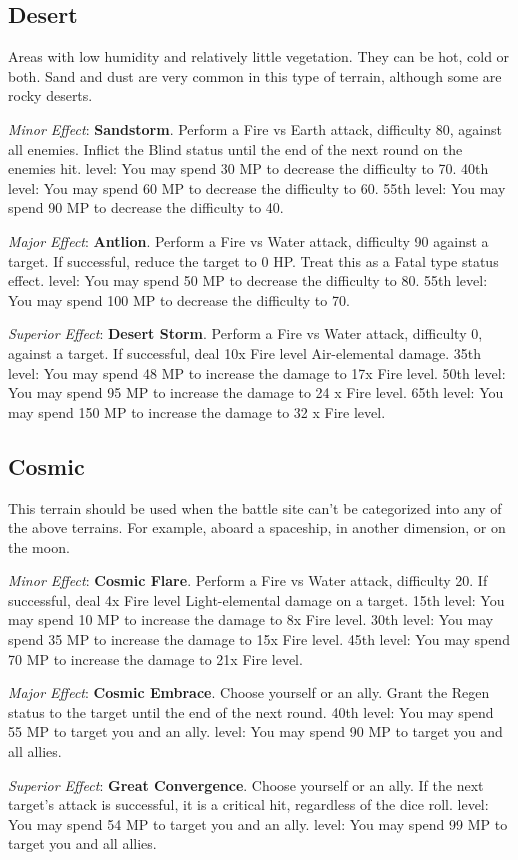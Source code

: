 \begin{multicols}{2}
\subsection*{Desert}\label{subsec:geo-desert}
Areas with low humidity and relatively little vegetation. They can be hot, cold or both. Sand and dust are very common in this type of terrain, although some are rocky deserts.

\textit{Minor Effect}: \textbf{Sandstorm}. Perform a Fire vs Earth attack, difficulty 80, against all enemies. Inflict the Blind status until the end of the next round on the enemies hit. level: You may spend 30 MP to decrease the difficulty to 70. 40th level: You may spend 60 MP to decrease the difficulty to 60. 55th level: You may spend 90 MP to decrease the difficulty to 40.

\textit{Major Effect}: \textbf{Antlion}. Perform a Fire vs Water attack, difficulty 90 against a target. If successful, reduce the target to 0 HP\@. Treat this as a Fatal type status effect.  level: You may spend 50 MP to decrease the difficulty to 80. 55th level: You may spend 100 MP to decrease the difficulty to 70.

\textit{Superior Effect}: \textbf{Desert Storm}. Perform a Fire vs Water attack, difficulty 0, against a target. If successful, deal 10x Fire level Air-elemental damage. 35th level: You may spend 48 MP to increase the damage to 17x Fire level. 50th level: You may spend 95 MP to increase the damage to 24 x Fire level. 65th level: You may spend 150 MP to increase the damage to 32 x Fire level.

\subsection*{Cosmic}\label{subsec:geo-cosmic}
This terrain should be used when the battle site can’t be categorized into any of the above terrains. For example, aboard a spaceship, in another dimension, or on the moon.

\textit{Minor Effect}: \textbf{Cosmic Flare}. Perform a Fire vs Water attack, difficulty 20. If successful, deal 4x Fire level Light-elemental damage on a target. 15th level: You may spend 10 MP to increase the damage to 8x Fire level. 30th level: You may spend 35 MP to increase the damage to 15x Fire level. 45th level: You may spend 70 MP to increase the damage to 21x Fire level.

\textit{Major Effect}: \textbf{Cosmic Embrace}. Choose yourself or an ally. Grant the Regen status to the target until the end of the next round. 40th level: You may spend 55 MP to target you and an ally.  level: You may spend 90 MP to target you and all allies.

\textit{Superior Effect}: \textbf{Great Convergence}. Choose yourself or an ally. If the next target’s attack is successful, it is a critical hit, regardless of the dice roll.  level: You may spend 54 MP to target you and an ally.  level: You may spend 99 MP to target you and all allies.

\end{multicols}
 
